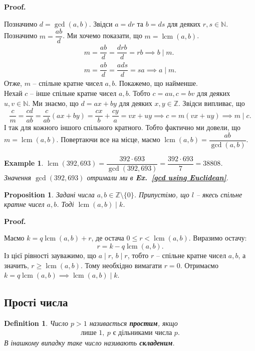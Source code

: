\documentclass[a4paper, 10pt]{article}
\makeatletter
\theoremstyle{theoremdd}
\theoremstyle{theoremdd}
\newtheorem{definition}[theorem]{Definition}
\theoremstyle{theoremdd}
\theoremstyle{theoremdd}
\newtheorem{example}[theorem]{Example}
\theoremstyle{theoremdd}
\newtheorem{proposition}[theorem]{Proposition}
\theoremstyle{theoremdd}
\theoremstyle{theoremdd}
\theoremstyle{theoremdd}
\renewenvironment{proof}[1][Proof.\\]{\par
\pushQED{\hfill \qed}%
\normalfont \topsep6\p@\@plus6\p@\relax
\trivlist
\item\relax
{\bfseries
#1\@addpunct{.}}\hspace\labelsep\ignorespaces
}{%
\popQED\endtrivlist\@endpefalse
}
\DeclareMathOperator{\lcm}{lcm}
\newcommand\exref[1]{\textbf{Ex.~\ref{#1}}}
\makeatother
\begin{document}
\begin{proof}
Позначимо $d = \gcd(a,b)$. Звідси $a=dr$ та $b=ds$ для деяких $r,s \in \mathbb{N}$. Позначимо $m = \dfrac{ab}{d}$. Ми хочемо показати, що $m = \lcm(a,b)$.
\begin{gather*}
m = \dfrac{ab}{d} = \dfrac{drb}{d} = rb \implies b \mid m. \\
m = \dfrac{ab}{d} = \dfrac{ads}{d} = sa \implies a \mid m.
\end{gather*}
Отже, $m$ -- спільне кратне чисел $a,b$. Покажемо, що найменше.\\
Нехай $c$ -- інше спільне кратне чисел $a,b$. Тобто $c = au, c =bv$ для деяких $u,v \in \mathbb{N}$. Ми знаємо, що $d = ax+by$ для деяких $x,y \in \mathbb{Z}$. Звідси випливає, що
\[
\dfrac{c}{m} = \dfrac{cd}{ab} = \dfrac{c}{ab}(ax+by) = \dfrac{cx}{b} + \dfrac{cy}{a} = vx+uy \implies c = m(vx+uy) \implies m \mid c.
\]
І так для кожного іншого спільного кратного. Тобто фактично ми довели, що $m = \lcm(a,b)$. Повертаючи все на місце, маємо $\lcm(a,b) = \dfrac{ab}{\gcd(a,b)}$.
\end{proof}

\begin{example}
$\lcm(392,693) = \dfrac{392 \cdot 693}{\gcd(392,693)} = \dfrac{392 \cdot 693}{7} = 38808$.\\
Значення $\gcd(392,693)$ отримали ми в \exref{gcd using Euclidean}.
\end{example}

\begin{proposition}
Задані числа $a,b \in \mathbb{Z} \setminus \{0\}$. Припустімо, що $l$ -- якесь спільне кратне чисел $a,b$. Тоді $\lcm(a,b) \mid k$.
\end{proposition}

\begin{proof}
Маємо $k = q \lcm(a,b) + r$, де остача $0 \leq r < \lcm(a,b)$. Виразимо остачу:
\[
r = k - q \lcm(a,b).
\]
Із цієї рівності зауважимо, що $a \mid r$, $b \mid r$, тобто $r$ -- спільне кратне чисел $a,b$, а значить, $r \geq \lcm(a,b)$. Тому необхідно вимагати $r = 0$. Отримаємо $k = q \lcm(a,b) \implies \lcm(a,b) \mid k$.
\end{proof}

\subsection{Прості числа}
\begin{definition}
Число $p > 1$ називається \textbf{простим}, якщо
\begin{align*}
\text{лише $1,\ p$ є дільниками числа $p$.}
\end{align*}
В інашкому випадку таке число називають \textbf{складеним}.
\end{definition}
\end{document}
